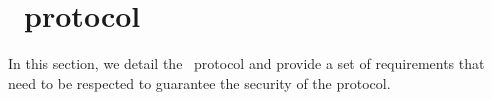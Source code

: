 
\chapter{\zeth~protocol}\label{chap:zeth-protocol}

In this section, we detail the \zeth~protocol and provide a set of requirements that need to be respected to guarantee the security of the protocol.

